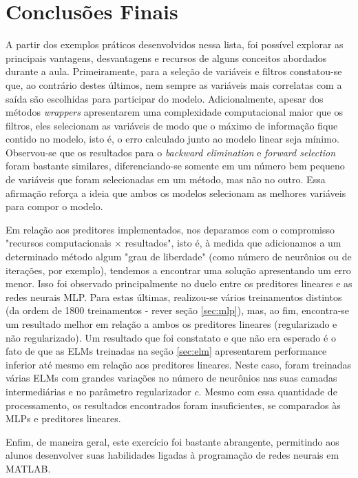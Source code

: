 \section{Conclusões Finais} 
 
A partir dos exemplos práticos desenvolvidos nessa lista, foi possível explorar
as principais vantagens, desvantagens e recursos de alguns conceitos abordados
durante a aula. Primeiramente, para a seleção de variáveis e filtros
constatou-se que, ao contrário destes últimos, nem sempre as variáveis mais
correlatas com a saída são escolhidas para participar do modelo.
Adicionalmente, apesar dos métodos \textit{wrappers} apresentarem uma
complexidade computacional maior que os filtros, eles selecionam as variáveis
de modo que o máximo de informação fique contido no modelo, isto é, o erro
calculado junto ao modelo linear seja mínimo. Observou-se que os resultados
para o \textit{backward elimination} e \textit{forward selection} foram 
bastante similares, diferenciando-se somente em um número bem pequeno de
variáveis que foram selecionadas em um método, mas não no outro. Essa afirmação
reforça a ideia que ambos os modelos selecionam as melhores variáveis para
compor o modelo. 

\vspace{12pt}

Em relação aos preditores implementados, nos deparamos com o compromisso
"recursos computacionais \(\times\) resultados", isto é, à medida que
adicionamos a um determinado método algum "grau de liberdade" (como número de
neurônios ou de iterações, por exemplo), tendemos a encontrar uma solução
apresentando um erro menor. Isso foi observado principalmente no duelo entre os
preditores lineares e as redes neurais MLP. Para estas últimas, realizou-se
vários treinamentos distintos (da ordem de 1800 treinamentos - rever seção
\ref{sec:mlp}), mas, ao fim, encontra-se um resultado melhor em relação a ambos
os preditores lineares (regularizado e não regularizado). Um resultado que foi
constatato e que não era esperado é o fato de que as ELMs treinadas na seção
\ref{sec:elm}  apresentarem performance inferior até mesmo em relação aos
preditores lineares. Neste caso, foram treinadas várias ELMs com grandes
variações no número de neurônios nas suas camadas intermediárias e no parâmetro
regularizador \(c\). Mesmo com essa quantidade de processamento, os resultados
encontrados foram insuficientes, se comparados às MLPs e preditores lineares.

\vspace{12pt} 

Enfim, de maneira geral, este exercício foi bastante abrangente, permitindo aos
alunos desenvolver suas habilidades ligadas à programação de redes neurais em
MATLAB.
